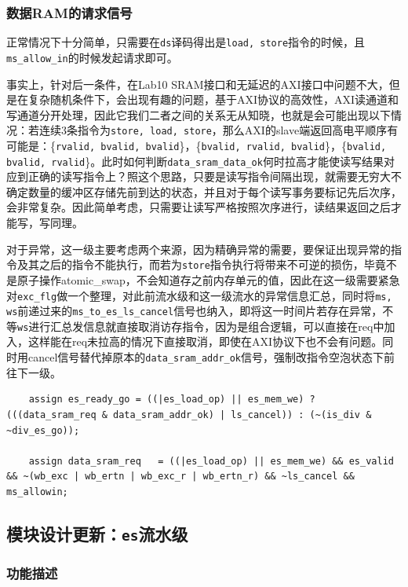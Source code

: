 \documentclass[UTF-8,twoside,c5size]{ctexart}
\begin{document}
	\subsubsection{数据RAM的请求信号}
	
	正常情况下十分简单，只需要在\texttt{ds}译码得出是\texttt{load, store}指令的时候，且\texttt{ms_allow_in}的时候发起请求即可。
	
	事实上，针对后一条件，在Lab10 SRAM接口和无延迟的AXI接口中问题不大，但是在复杂随机条件下，会出现有趣的问题，基于AXI协议的高效性，AXI读通道和写通道分开处理，因此它我们二者之间的关系无从知晓，也就是会可能出现以下情况：若连续3条指令为\texttt{store, load, store}，那么AXI的slave端返回高电平顺序有可能是：\{\texttt{rvalid, bvalid, bvalid}\}，\{\texttt{bvalid, rvalid, bvalid}\}，\{\texttt{bvalid, bvalid, rvalid}\}。此时如何判断\texttt{data_sram_data_ok}何时拉高才能使读写结果对应到正确的读写指令上？照这个思路，只要是读写指令间隔出现，就需要无穷大不确定数量的缓冲区存储先前到达的状态，并且对于每个读写事务要标记先后次序，会非常复杂。因此简单考虑，只需要让读写严格按照次序进行，读结果返回之后才能写，写同理。
	
	对于异常，这一级主要考虑两个来源，因为精确异常的需要，要保证出现异常的指令及其之后的指令不能执行，而若为\texttt{store}指令执行将带来不可逆的损伤，毕竟不是原子操作atomic_swap，不会知道存之前内存单元的值，因此在这一级需要紧急对\texttt{exc_flg}做一个整理，对此前流水级和这一级流水的异常信息汇总，同时将\texttt{ms, ws}前递过来的\texttt{ms_to_es_ls_cancel}信号也纳入，即将这一时间片若存在异常，不等\texttt{ws}进行汇总发信息就直接取消访存指令，因为是组合逻辑，可以直接在req中加入，这样能在req未拉高的情况下直接取消，即使在AXI协议下也不会有问题。同时用cancel信号替代掉原本的\texttt{data_sram_addr_ok}信号，强制改指令空泡状态下前往下一级。
	
    \begin{verbatim}
    assign es_ready_go = ((|es_load_op) || es_mem_we) ? (((data_sram_req & data_sram_addr_ok) | ls_cancel)) : (~(is_div & ~div_es_go));

    assign data_sram_req   = ((|es_load_op) || es_mem_we) && es_valid && ~(wb_exc | wb_ertn | wb_exc_r | wb_ertn_r) && ~ls_cancel && ms_allowin;
    \end{verbatim}

	\subsection{模块设计更新：\texttt{es}流水级}
	
	\subsubsection{功能描述}
	
\end{document}
